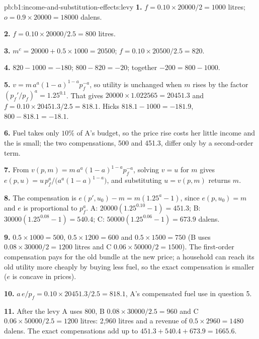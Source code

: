 \begin{solution}{pb:b1:income-and-substitution-effects:levy}
\textbf{1.} $f = 0.10 \times 20000/2 = 1000$ litres; $o = 0.9 \times 20000 = 18000$
dalens.

\textbf{2.} $f = 0.10 \times 20000/2.5 = 800$ litres.

\textbf{3.} $m^c = 20000 + 0.5 \times 1000 = 20500$; $f = 0.10 \times 20500/2.5 = 820$.

\textbf{4.}  $820 - 1000 = -180$;  $800 - 820 = -20$;
together $-200 = 800 - 1000$.

\textbf{5.} $v = m\,a^a(1 - a)^{1-a}p_f^{-a}$, so utility is unchanged when $m$ rises
by the factor $(p_f'/p_f)^a = 1.25^{0.1}$. That gives
$20000 \times 1.022565 = 20451.3$ and $f = 0.10 \times 20451.3/2.5 = 818.1$. Hicks
 $818.1 - 1000 = -181.9$,  $800 - 818.1 = -18.1$.

\textbf{6.} Fuel takes only $10\%$ of A's budget, so the price rise costs her
little income and the  is small; the two compensations, 500
and 451.3, differ only by a second-order term.

\textbf{7.} From $v(p, m) = m\,a^a(1 - a)^{1-a}p_f^{-a}$, solving $v = u$ for $m$
gives $e(p, u) = u\,p_f^{a}/\bigl(a^a(1 - a)^{1-a}\bigr)$, and substituting
$u = v(p, m)$ returns $m$.

\textbf{8.} The compensation is $e(p', u_0) - m = m(1.25^{a} - 1)$, since
$e(p, u_0) = m$ and $e$ is proportional to $p_f^a$. A:
$20000(1.25^{0.10} - 1) = 451.3$; B: $30000(1.25^{0.08} - 1) = 540.4$;
C: $50000(1.25^{0.06} - 1) = 673.9$ dalens.

\textbf{9.} $0.5 \times 1000 = 500$, $0.5 \times 1200 = 600$ and $0.5 \times 1500 = 750$ (B uses
$0.08 \times 30000/2 = 1200$ litres and C $0.06 \times 50000/2 = 1500$). The
first-order compensation pays for the old bundle at the new price; a
household can reach its old utility more cheaply by buying less fuel, so
the exact compensation is smaller ($e$ is concave in prices).

\textbf{10.} $a\,e/p_f = 0.10 \times 20451.3/2.5 = 818.1$, A's compensated fuel use in
question 5.

\textbf{11.} After the levy A uses 800, B $0.08 \times 30000/2.5 = 960$ and C
$0.06 \times 50000/2.5 = 1200$ litres: 2,960 litres and a revenue of
$0.5 \times 2960 = 1480$ dalens. The exact compensations add up to
$451.3 + 540.4 + 673.9 = 1665.6$.


\end{solution}
